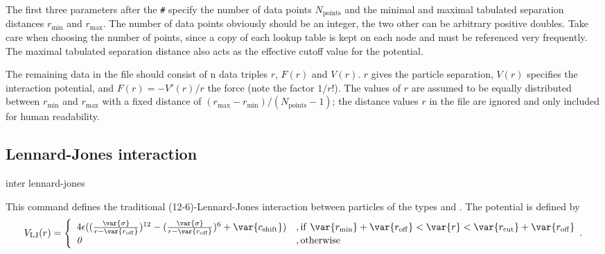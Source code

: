 The first three parameters after the {\tt \#} specify the number of data points
$N_\mathrm{points}$ and the minimal and maximal tabulated separation distances
$r_\mathrm{min}$ and $r_\mathrm{max}$. The number of data points obviously should
be an integer, the two other can be arbitrary positive doubles. Take care when
choosing the number of points, since a copy of each lookup table is kept on each
node and must be referenced very frequently. The maximal tabulated separation
distance also acts as the effective cutoff value for the potential.

The remaining data in the file should consist of n data triples $r$, $F(r)$ and
$V(r)$. $r$ gives the particle separation, $V(r)$ specifies the interaction
potential, and $F(r)= -V'(r)/r$ the force (note the factor $1/r$!). The values
of $r$ are assumed to be equally distributed between $r_\mathrm{min}$ and
$r_\mathrm{max}$ with a fixed distance of
$(r_\mathrm{max}-r_\mathrm{min})/(N_\mathrm{points}-1)$; the distance values $r$ in
the file are ignored and only included for human readability.

\subsection{Lennard-Jones interaction}
\label{sec:LennardJones}

\begin{essyntax}
  inter  
  lennard-jones 
  \var{\epsilon} \var{\sigma} 
  \begin{features}
  \end{features}
\end{essyntax}

This command defines the traditional (12-6)-Lennard-Jones interaction
between particles of the types  and .  The
potential is defined by
\begin{equation}
  \label{eq:lj}
  V_\mathrm{LJ}(r) = \Biggl\{
    \begin{array}{ll}
      4\epsilon((\frac{\var{\sigma}}{r-\var{r_\mathrm{off}}})^{12}
      - (\frac{\var{\sigma}}{r-\var{r_\mathrm{off}}})^6+\var{c_\mathrm{shift}}) 
      & \mathrm{, if~} \var{r_\mathrm{min}}+\var{r_\mathrm{off}} < \var{r} < \var{r_\mathrm{cut}}+\var{r_\mathrm{off}}\\
      \mathit{0} 
      & \mathrm{, otherwise}\\
    \end{array}.
\end{equation}

